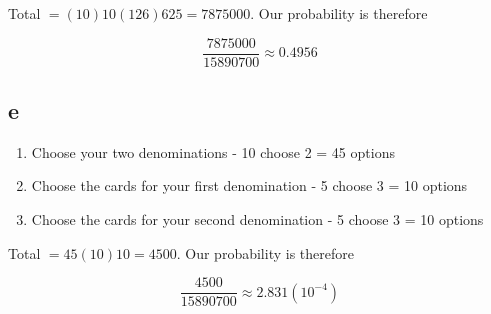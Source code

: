 \documentclass[11pt]{article}
\begin{document}
Total $=(10)10(126)625=7875000$. Our probability is therefore 

$$\frac{7875000}{15890700}\approx 0.4956$$

\subsection{e}

\begin{enumerate}
\item Choose your two denominations - 10 choose 2 = 45 options
\item Choose the cards for your first denomination - 5 choose 3 = 10 options
\item Choose the cards for your second denomination - 5 choose 3 = 10 options
\end{enumerate}

Total $=45(10)10=4500$. Our probability is therefore 

$$\frac{4500}{15890700}\approx 2.831(10^{-4})$$
\end{document}
